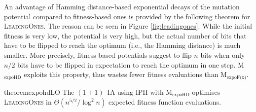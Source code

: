 \documentclass[lettersize,journal]{IEEEtran}
\newcommand{\oneoneIA}{$(1+1)$~IA}
\newcommand{\expoF}{M$_{\text{expoF(x)}}$}
\newcommand{\expoHD}{M$_{\text{expoHD}}$}
\newcommand{\IPHfcm}{IPH}
\begin{document}
 

An advantage of Hamming distance-based exponential decays of the mutation potential
compared to fitness-based ones is provided by the following theorem for \textsc{LeadingOnes}.
The reason can be seen in Figure \ref{fig:leadingones}.  While the initial fitness is very low, the potential is very high, but the actual number of bits that have to be flipped to reach the optimum (i.e., the Hamming distance) is much smaller. More precisely, fitness-based potentials suggest to flip $n$ bits when only $n/2$ bits have to be flipped in expectation to reach the optimum in one step. 
{\expoHD } exploits this property, thus wastes fewer fitness evaluations than \expoF. 




\begin{restatable}{theorem}{expohdLO}\label{thm:expohdLO}
The {\oneoneIA } using \IPHfcm{} with {\expoHD } optimises
\textsc{LeadingOnes} in $\Theta(n^{5/2}/\log^2 n)$ expected fitness function
evaluations.
\end{restatable}
\end{document}
